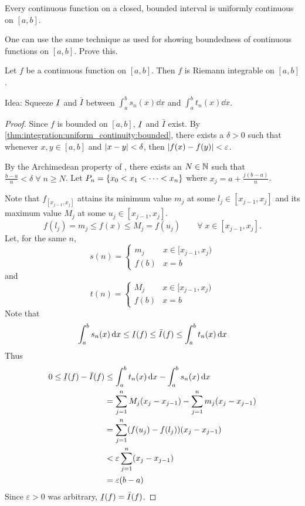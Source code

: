 \begin{thm} \label{thm:integration:uniform_continuity:bounded}
    Every continuous function on a closed, bounded interval is uniformly continuous on $[a, b]$.
\end{thm}
One can use the same technique as used for showing boundedness of continuous functions on $[a, b]$. \textcolor{exercise}{Prove this}.

\begin{thm} \label{thm:continuous RI}
    Let $f$ be a continuous function on $[a, b]$. Then $f$ is Riemann integrable on $[a, b]$.
\end{thm}

Idea: Squeeze $\ubar{I}$ and $\bar{I}$ between $\int_{a}^{b} s_{n}(x) \dd x$ and $\int_{a}^{b} t_{n}(x) \dd x$.

\begin{proof}
    Since $f$ is bounded on $[a, b]$, $\ubar{I}$ and $\bar{I}$ exist.
    By \cref{thm:integration:uniform_continuity:bounded}, there exists a $\delta > 0$ such that whenever $x, y \in [a, b]$ and $\abs{x - y} < \delta$, then $\abs{f(x) - f(y)} < \varepsilon$.
    
    By the Archimedean property of \R, there exists an $N \in \mathbb{N}$ such that $\frac{b - a}{n} < \delta \;\forall\; n \geq N$.
    Let $P_{n} = \set{x_{0} < x_{1} < \dots < x_{n}}$ where $x_{j} = a + \frac{j(b - a)}{n}$.

    Note that $f_{[x_{j-1}, x_{j}]}$ attains its minimum value $m_{j}$ at some $l_{j} \in [x_{j-1}, x_{j}]$ and its maximum value $M_{j}$ at some $u_{j} \in [x_{j-1}, x_{j}]$. \[
        f(l_{j}) = m_{j} \leq f(x) \leq M_{j} = f(u_{j}) \qquad\forall\; x \in [x_{j-1}, x_{j}].
    \] Let, for the same $n$, \[
        s(n) = 
        \begin{cases}
            m_{j} & x \in [x_{j-1}, x_{j}) \\
            f(b) & x = b
        \end{cases}
    \] and \[
        t(n) = 
        \begin{cases}
            M_{j} & x \in [x_{j-1}, x_{j}) \\
            f(b) & x = b
        \end{cases}
    \] Note that \[
        \int_{a}^{b} s_{n}(x) \dd x \leq \ubar{I}(f) \leq \bar{I}(f) \leq \int_{a}^{b} t_{n}(x) \dd x
    \] Thus
    \begin{align*}
        0 \leq \ubar{I}(f) - \bar{I}(f) &\leq \int_{a}^{b} t_{n}(x) \dd x - \int_{a}^{b} s_{n}(x) \dd x \\
        &= \sum_{j = 1}^{n} M_{j} (x_{j} - x_{j-1}) - \sum_{j = 1}^{n} m_{j} (x_{j} - x_{j-1}) \\
        &= \sum_{j = 1}^{n} (f(u_{j}) - f(l_{j})) (x_{j} - x_{j-1}) \\
        &< \varepsilon \sum_{j = 1}^{n} (x_{j} - x_{j-1}) \\
        &= \varepsilon (b - a)
    \end{align*}
    Since $\varepsilon > 0$ was arbitrary, $\ubar{I}(f) = \bar{I}(f)$.
\end{proof}

